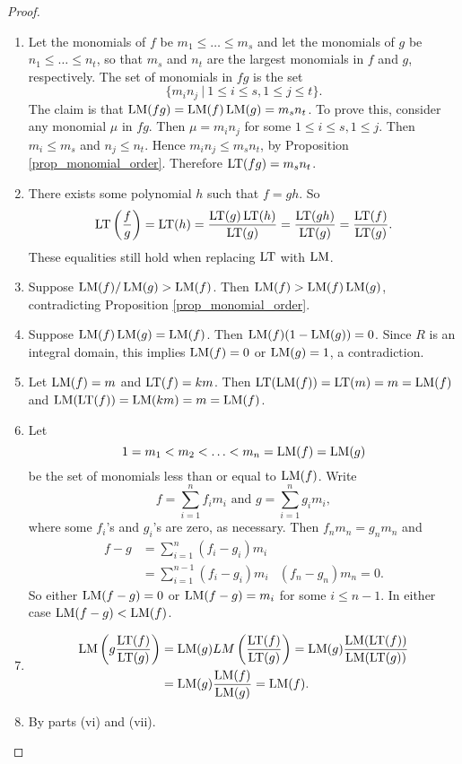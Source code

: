 \begin{proof}
  \begin{enumerate}[label=(\roman*)]
    \item
      Let the monomials of $f$ be $m_1 \leq \dots \leq m_s$ and let the monomials of $g$ be $n_1 \leq \dots \leq n_t$,
      so that $m_s$ and $n_t$ are the largest monomials in $f$ and $g$, respectively.
      The set of monomials in $fg$ is the set
      \[ \{ m_in_j ~|~ 1 \leq i \leq s, 1 \leq j \leq t \}. \]
      The claim is that $\operatorname{LM}(fg) = \operatorname{LM}(f)\operatorname{LM}(g) = m_sn_t$.
      To prove this, consider any monomial $\mu$ in $fg$.
      Then $\mu = m_in_j$ for some $1 \leq i \leq s, 1 \leq j$.
      Then $m_i \leq m_s$ and $n_j \leq n_t$.
      Hence $m_in_j \leq m_sn_t$, by Proposition \ref{prop_monomial_order}.
      Therefore $\operatorname{LT}(fg) = m_sn_t$.
      
    \item
      There exists some polynomial $h$ such that $f = gh$. So
      \[   \operatorname{LT}\left(\frac f g \right)
         = \operatorname{LT}(h)
         = \frac{\operatorname{LT}(g)\operatorname{LT}(h)}{\operatorname{LT}(g)}
         = \frac{\operatorname{LT}(gh)}{\operatorname{LT}(g)}
         = \frac{\operatorname{LT}(f)}{\operatorname{LT}(g)}. \]
      These equalities still hold when replacing $\operatorname{LT}$ with $\operatorname{LM}$.
    \item
      Suppose $\operatorname{LM}(f)/\operatorname{LM}(g) > \operatorname{LM}(f)$.
      Then $\operatorname{LM}(f) > \operatorname{LM}(f)\operatorname{LM}(g)$, contradicting Proposition \ref{prop_monomial_order}.
    \item
      Suppose $\operatorname{LM}(f)\operatorname{LM}(g) = \operatorname{LM}(f)$.
      Then $\operatorname{LM}(f)(1 - \operatorname{LM}(g)) = 0$.
      Since $R$ is an integral domain, this implies $\operatorname{LM}(f) = 0$ or $\operatorname{LM}(g) = 1$, a contradiction.
    \item
      Let $\operatorname{LM}(f) = m$ and $\operatorname{LT}(f) = km$.
      Then $\operatorname{LT}(\operatorname{LM}(f)) = \operatorname{LT}(m) = m = \operatorname{LM}(f)$ and $\operatorname{LM}(\operatorname{LT}(f)) = \operatorname{LM}(km) = m = \operatorname{LM}(f)$.
    \item
      Let
      \[ 1 = m_1 < m_2 < \ldots < m_n = \operatorname{LM}(f) = \operatorname{LM}(g) \]
      be the set of monomials less than or equal to $\operatorname{LM}(f)$.
      Write
      \[ f = \sum_{i=1}^n f_im_i \text{ and } g = \sum_{i=1}^n g_im_i, \]
      where some $f_i$'s and $g_i$'s are zero, as necessary.
      Then $f_nm_n = g_nm_n$ and
      \begin{align*}
        f - g
          &= \sum_{i=1}^n (f_i - g_i)m_i \\
          &= \sum_{i=1}^{n-1} (f_i - g_i)m_i & (f_n - g_n)m_n = 0.
      \end{align*}
      So either $\operatorname{LM}(f - g) = 0$ or $\operatorname{LM}(f - g) = m_i$ for some $i \leq n - 1$.
      In either case $\operatorname{LM}(f - g) < \operatorname{LM}(f)$.
    \item
      \begin{align*}
       \operatorname{LM}\left( g \frac{\operatorname{LT}(f)}{\operatorname{LT}(g)} \right)
         &= \operatorname{LM}(g) LM\left( \frac{\operatorname{LT}(f)}{\operatorname{LT}(g)} \right)
         = \operatorname{LM}(g) \frac{\operatorname{LM}(\operatorname{LT}(f))}{\operatorname{LM}(\operatorname{LT}(g))} \\
         &= \operatorname{LM}(g) \frac{\operatorname{LM}(f)}{\operatorname{LM}(g)}
         = \operatorname{LM}(f).
      \end{align*}
    \item By parts (vi) and (vii).
  \end{enumerate}
\end{proof}

